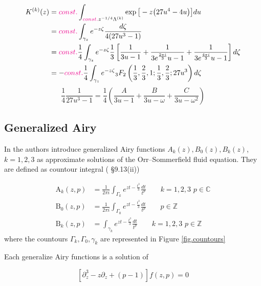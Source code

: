 \documentclass{article}
\theoremstyle{definition}
\newcommand{\Z}{\mathbb{Z}}
\newcommand{\C}{\mathbb{C}}
\begin{document}
\begin{align*}
K^{(k)}(z)&=\textcolor{magenta}{const.} \int_{\textcolor{magenta}{const.}z^{-1/4}\Lambda^{(k)}}\exp\big[- z \big(27 u^4-4 u\big)\big] du\\
&=\textcolor{magenta}{const.} \int_{\gamma_z}e^{-z\zeta} \frac{d\zeta}{4(27u^3-1)}\\
&=\textcolor{magenta}{const.} \frac{1}{4}\int_{\gamma_z}e^{-z\zeta}\frac{1}{3}\left[\frac{1}{3u-1}+\frac{1}{3e^{\frac{2\pi i}{3}} u -1}+\frac{1}{3e^{\frac{4\pi i}{3}} u-1}\right] d\zeta\\
&=-\textcolor{magenta}{const.} \frac{1}{4}\int_{\gamma_z}e^{-z\zeta} {}_3F_2\left(\frac{1}{3},\frac{2}{3},1;\frac{1}{3},\frac{2}{3};27 u^3\right) d\zeta
\end{align*}
\[
\frac{1}{4}\frac{1}{27u^3-1}=\frac{1}{4}(\frac{A}{3u-1}+\frac{B}{3u-\omega}+\frac{C}{3u-\omega^2})
\]



\subsection{Generalized Airy}

In \cite{Reid} \cite{Drazin-Reid} the authors introduce generalized Airy functions $A_k(z), B_0(z), B_k(z)$, $k=1,2,3$ as approximate solutions of the Orr--Sommerfield fluid equation. They are defined as countour integral (\cite{DLMF} \S 9.13(ii))

\begin{align*}
\mathrm{A}_k(z,p)&=\frac{1}{2\pi i}\int_{\Gamma_k}e^{zt-\tfrac{t^3}{3}}\frac{dt}{t^p} \qquad k=1,2,3\,\, p\in\C \\
\mathrm{B}_0(z,p)&=\frac{1}{2\pi i}\int_{\Gamma_0}e^{zt-\tfrac{t^3}{3}}\frac{dt}{t^p} \qquad p\in\Z \\
\mathrm{B}_k(z,p)&=\int_{\gamma_k}e^{zt-\tfrac{t^3}{3}}\frac{dt}{t^p} \qquad k=1,2,3\,\, p\in\Z 
\end{align*}
where the countours $\Gamma_k, \Gamma_0, \gamma_k$ are represented in Figure \ref{fig.countours} 

\begin{figure}
\end{figure}

Each generalize Airy functions is a solution of

\begin{equation}
\left[\partial_z^3-z\partial_z+(p-1)\right]f(z,p)=0
\end{equation} 
\end{document}

